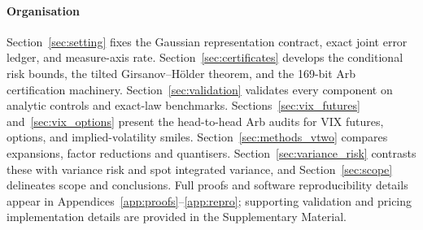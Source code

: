 \paragraph{Organisation}
Section~\ref{sec:setting} fixes the Gaussian representation contract, exact joint error ledger, and
measure-axis rate. Section~\ref{sec:certificates} develops the conditional risk bounds, the tilted
Girsanov--H\"older theorem, and the 169-bit Arb certification machinery. Section~\ref{sec:validation}
validates every component on analytic controls and exact-law benchmarks. Sections~\ref{sec:vix_futures}
and~\ref{sec:vix_options} present the head-to-head Arb audits for VIX futures, options, and implied-volatility
smiles. Section~\ref{sec:methods_vtwo} compares expansions, factor reductions and quantisers. Section~\ref{sec:variance_risk} contrasts these with variance risk and spot integrated variance,
and Section~\ref{sec:scope} delineates scope and conclusions. Full proofs and software reproducibility
details appear in Appendices~\ref{app:proofs}--\ref{app:repro}; supporting validation and pricing implementation details are provided in the Supplementary Material.
